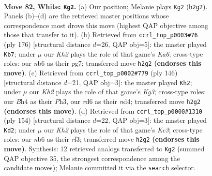\documentclass[11pt]{article}
\begin{document}
\clearpage

\begin{figure}[p]\centering
\begin{subfigure}{0.46\textwidth}\centering
\resizebox{\linewidth}{!}{%
\newchessgame
\chessboard[
  setfen={6k1/8/1n1r4/5R2/p4P1B/P6P/7K/8 w - - 19 82},
  showmover=false,
  pgfstyle=straightmove, color=movearrow, markmove={h2-g2}
]}
\caption{}
\end{subfigure}\hfill
\begin{subfigure}{0.46\textwidth}\centering
\resizebox{\linewidth}{!}{%
\newchessgame
\chessboard[
  setfen={R7/P4kp1/K6p/7P/8/8/r7/8 w - - 19 89},
  showmover=false,
  pgfstyle=straightmove, color=movearrow, markmove={a6-b7}
]}
\caption{}
\end{subfigure}
\\[4pt]
\begin{subfigure}{0.46\textwidth}\centering
\resizebox{\linewidth}{!}{%
\newchessgame
\chessboard[
  setfen={2R5/3r3p/6p1/6B1/3n4/6KP/6P1/3k4 w - - 20 74},
  showmover=false,
  pgfstyle=straightmove, color=movearrow, markmove={g3-h2}
]}
\caption{}
\end{subfigure}\hfill
\begin{subfigure}{0.46\textwidth}\centering
\resizebox{\linewidth}{!}{%
\newchessgame
\chessboard[
  setfen={8/8/R7/P2k1p1p/1P6/2K2r2/8/8 w - - 1 78},
  showmover=false,
  pgfstyle=straightmove, color=movearrow, markmove={c3-d2}
]}
\caption{}
\end{subfigure}
\caption{\textbf{Move 82, White: \texttt{Kg2}.} (a) Our position; Melanie plays \texttt{Kg2} (\texttt{h2g2}). Panels (b)--(d) are the retrieved master positions whose correspondence most drove this move (highest QAP objective among those that transfer to it). (b) Retrieved from \texttt{ccrl\_top\_p0003\#76} (ply 176) [structural distance $d$=26, QAP obj=5]: the master played \texttt{Kb7}; under $\mu$ our \emph{Kh2} plays the role of that game's \emph{Ka6}; cross-type roles: our \emph{n}b6 as their \emph{p}g7; transferred move \texttt{h2g2} \textbf{(endorses this move)}. (c) Retrieved from \texttt{ccrl\_top\_p0002\#779} (ply 146) [structural distance $d$=21, QAP obj=3]: the master played \texttt{Kh2}; under $\mu$ our \emph{Kh2} plays the role of that game's \emph{Kg3}; cross-type roles: our \emph{B}h4 as their \emph{P}h3, our \emph{r}d6 as their \emph{n}d4; transferred move \texttt{h2g2} \textbf{(endorses this move)}. (d) Retrieved from \texttt{ccrl\_top\_p0000\#1310} (ply 154) [structural distance $d$=22, QAP obj=3]: the master played \texttt{Kd2}; under $\mu$ our \emph{Kh2} plays the role of that game's \emph{Kc3}; cross-type roles: our \emph{n}b6 as their \emph{r}f3; transferred move \texttt{h2g2} \textbf{(endorses this move)}. Synthesis: 12 retrieved analogs transferred to \texttt{Kg2} (summed QAP objective 35, the strongest correspondence among the candidate moves); Melanie committed it via the \texttt{search} selector.}
\label{fig:thought-m162}
\end{figure}
\end{document}
